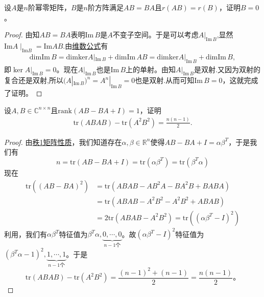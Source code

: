 \documentclass[../../main.tex]{subfiles}
\begin{document}
\begin{example}
设\( A \)是\( n \)阶幂零矩阵，\( B \)是\( n \)阶方阵满足\( AB = BA \)且\( r(AB) = r(B) \)，证明\( B = 0 \)。
\end{example}
\begin{proof}
由知\( AB = BA \)表明\( \text{Im}\, B \)是\( A \)不变子空间。于是可以考虑\( A|_{\text{Im}\, B} \),显然$\mathrm{Im} A\mid_{\mathrm{Im} B}=\mathrm{Im} AB$.由\hyperref[theorem:交和空间维数公式]{维数公式}有
\begin{align*}
\mathrm{dimIm}\,B=\mathrm{dimker}A|_{\mathrm{Im}\,B}+\mathrm{dimIm}\,AB=\mathrm{dimker}A|_{\mathrm{Im}\,B}+\mathrm{dimIm}\,B,
\end{align*}
即\( \ker A|_{\text{Im}\, B} = 0 \)。现在\( A|_{\text{Im}\, B} \)也是\( \text{Im}\, B \)上的单射。由知\( A|_{\text{Im}\, B} \)是双射.又因为双射的复合还是双射,所以\( (A|_{\text{Im}\, B})^n = A^n|_{\text{Im}\, B} = 0 \)也是双射.从而可知\( \text{Im}\, B = 0 \)，这就完成了证明。
\end{proof}

\begin{example}
设\( A,B \in \mathbb{C}^{n \times n} \)且\( \text{rank}(AB - BA + I) = 1 \)，证明
\begin{align}
\text{tr}(ABAB) - \text{tr}(A^2B^2) = \frac{n(n - 1)}{2}. \label{EQ:::-48972489-----12-1--23.116}
\end{align}
\end{example}
\begin{proof}
由\hyperref[lemma:秩1矩阵的列向量分解]{秩1矩阵性质}，我们知道存在\( \alpha,\beta \in \mathbb{R}^n \)使得\( AB - BA + I = \alpha\beta^T \)，于是我们有
\[
n = \text{tr}(AB - BA + I) = \text{tr}(\alpha\beta^T) = \text{tr}(\beta^T\alpha)
\]
现在
\[
\begin{aligned}
\text{tr}\left((AB - BA)^2\right) &= \text{tr}(ABAB - AB^2A - BA^2B + BABA) \\
&= \text{tr}(ABAB - A^2B^2 - A^2B^2 + ABAB) \\
&= 2\text{tr}(ABAB - A^2B^2) = \text{tr}\left((\alpha\beta^T - I)^2\right)
\end{aligned}
\]
利用，我们有\( \alpha\beta^T \)特征值为\( \beta^T\alpha,\underbrace{0,\cdots,0}_{n-1个} \)。故\( (\alpha\beta^T - I)^2 \)特征值为\( (\beta^T\alpha - 1)^2,\underbrace{1,\cdots,1}_{n-1个} \)。于是
\[
\text{tr}(ABAB) - \text{tr}(A^2B^2) = \frac{(n - 1)^2 + (n - 1)}{2} = \frac{n(n - 1)}{2}。
\]
\end{proof}
\end{document}
